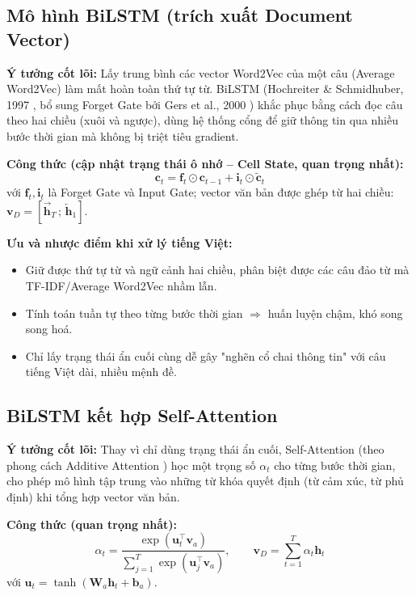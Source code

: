 \documentclass[12pt,a4paper]{article}
\begin{document}
\subsection{Mô hình BiLSTM (trích xuất Document Vector)}\label{sec:lstm_doc_rep}
\textbf{Ý tưởng cốt lõi:} Lấy trung bình các vector Word2Vec của một câu (Average Word2Vec) làm mất hoàn toàn thứ tự từ. BiLSTM (Hochreiter \& Schmidhuber, 1997 \cite{hochreiter1997lstm}, bổ sung Forget Gate bởi Gers et al., 2000 \cite{gers2000learning}) khắc phục bằng cách đọc câu theo hai chiều (xuôi và ngược), dùng hệ thống cổng để giữ thông tin qua nhiều bước thời gian mà không bị triệt tiêu gradient.

\textbf{Công thức (cập nhật trạng thái ô nhớ -- Cell State, quan trọng nhất):}
\begin{equation}
    \mathbf{c}_t = \mathbf{f}_t \odot \mathbf{c}_{t-1} + \mathbf{i}_t \odot \tilde{\mathbf{c}}_t
\end{equation}
với $\mathbf{f}_t, \mathbf{i}_t$ là Forget Gate và Input Gate; vector văn bản được ghép từ hai chiều: $\mathbf{v}_D = [\vec{\mathbf{h}}_T \,;\, \overleftarrow{\mathbf{h}}_1]$.

\textbf{Ưu và nhược điểm khi xử lý tiếng Việt:}
\begin{itemize}[leftmargin=1.0cm, itemsep=2pt]
    \item[+] Giữ được thứ tự từ và ngữ cảnh hai chiều, phân biệt được các câu đảo từ mà TF-IDF/Average Word2Vec nhầm lẫn.
    \item[--] Tính toán tuần tự theo từng bước thời gian $\Rightarrow$ huấn luyện chậm, khó song song hoá.
    \item[--] Chỉ lấy trạng thái ẩn cuối cùng dễ gây "nghẽn cổ chai thông tin" với câu tiếng Việt dài, nhiều mệnh đề.
\end{itemize}

\subsection{BiLSTM kết hợp Self-Attention}\label{sec:bilstm_attn}
\textbf{Ý tưởng cốt lõi:} Thay vì chỉ dùng trạng thái ẩn cuối, Self-Attention (theo phong cách Additive Attention \cite{bahdanau2015neural}) học một trọng số $\alpha_t$ cho từng bước thời gian, cho phép mô hình tập trung vào những từ khóa quyết định (từ cảm xúc, từ phủ định) khi tổng hợp vector văn bản.

\textbf{Công thức (quan trọng nhất):}
\begin{equation}
    \alpha_t = \frac{\exp(\mathbf{u}_t^\top \mathbf{v}_a)}{\sum_{j=1}^{T} \exp(\mathbf{u}_j^\top \mathbf{v}_a)}, \qquad \mathbf{v}_D = \sum_{t=1}^{T} \alpha_t \mathbf{h}_t
\end{equation}
với $\mathbf{u}_t = \tanh(\mathbf{W}_a \mathbf{h}_t + \mathbf{b}_a)$.
\end{document}
